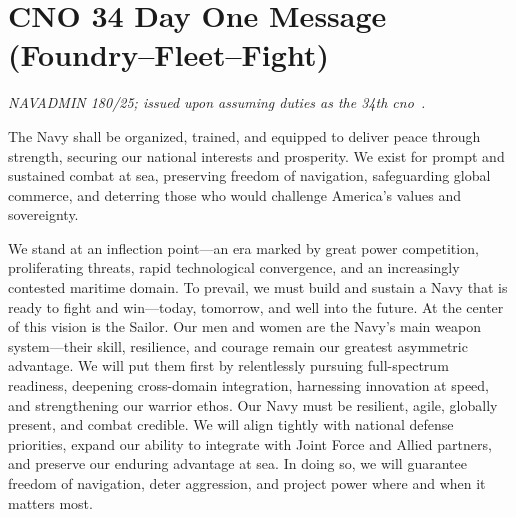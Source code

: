 \documentclass[../main.tex]{subfiles}
\begin{document}

\section{CNO 34 Day One Message (Foundry--Fleet--Fight)}\label{app:cno34-day-one-message}
\emph{\footnotesize NAVADMIN 180/25; issued upon assuming duties as the 34th \ac{cno}~\autocite{cno34-day-one-message-2025}.}

\begin{description}[style=nextline, labelsep=0.5em, font=\bfseries]
  \item[\textbf{Mission.}] The Navy shall be organized, trained, and equipped to deliver peace through strength, securing our national interests and prosperity. We exist for prompt and sustained combat at sea, preserving freedom of navigation, safeguarding global commerce, and deterring those who would challenge America's values and sovereignty.

  \item[\textbf{Vision.}] We stand at an inflection point---an era marked by great power competition, proliferating threats, rapid technological convergence, and an increasingly contested maritime domain. To prevail, we must build and sustain a Navy that is ready to fight and win---today, tomorrow, and well into the future. At the center of this vision is the Sailor. Our men and women are the Navy's main weapon system---their skill, resilience, and courage remain our greatest asymmetric advantage. We will put them first by relentlessly pursuing full-spectrum readiness, deepening cross-domain integration, harnessing innovation at speed, and strengthening our warrior ethos. Our Navy must be resilient, agile, globally present, and combat credible. We will align tightly with national defense priorities, expand our ability to integrate with Joint Force and Allied partners, and preserve our enduring advantage at sea. In doing so, we will guarantee freedom of navigation, deter aggression, and project power where and when it matters most.


\end{description}
\end{document}
